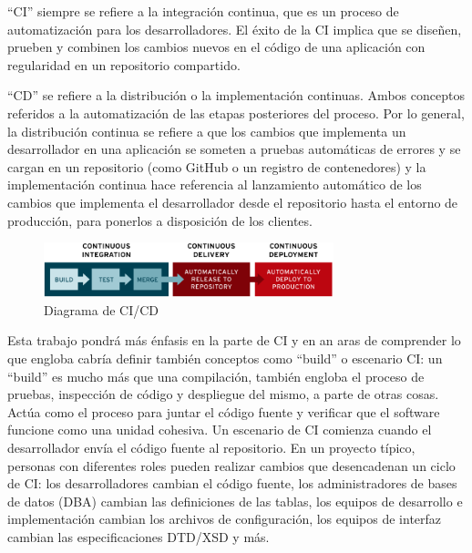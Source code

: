 ``CI'' siempre se refiere a la integración continua, que es un proceso de automatización para los desarrolladores. El éxito de la CI implica que se diseñen, prueben y combinen los cambios nuevos en el código de una aplicación con regularidad en un repositorio compartido.

``CD'' se refiere a la distribución o la implementación continuas. Ambos conceptos referidos a la automatización de las etapas posteriores del proceso. Por lo general, la distribución continua se refiere a que los cambios que implementa un desarrollador en una aplicación se someten a pruebas automáticas de errores y se cargan en un repositorio (como GitHub o un registro de contenedores) y la implementación continua hace referencia al lanzamiento automático de los cambios que implementa el desarrollador desde el repositorio hasta el entorno de producción, para ponerlos a disposición de los clientes.

\begin{figure}[h]
    \centering
    \includegraphics[width=0.75\textwidth,clip=true]{imgs/ci-cd-flow-desktop.png}
    \caption{Diagrama de CI/CD}
\end{figure}

Esta trabajo pondrá más énfasis en la parte de CI y en an aras de comprender lo que engloba cabría definir también conceptos como ``build'' o escenario CI: un ``build'' es mucho más que una compilación, también engloba el proceso de pruebas, inspección de código y despliegue del mismo, a parte de otras cosas. Actúa como el proceso para juntar el código fuente y verificar que el software funcione como una unidad cohesiva. Un escenario de CI comienza cuando el desarrollador envía el código fuente al repositorio. En un proyecto típico, {personas} con diferentes roles pueden realizar cambios que desencadenan un ciclo de CI: los desarrolladores cambian el código fuente, los administradores de bases de datos (DBA) cambian las definiciones de las tablas, los equipos de desarrollo e implementación cambian los archivos de configuración, los equipos de interfaz cambian las especificaciones DTD/XSD y más.


